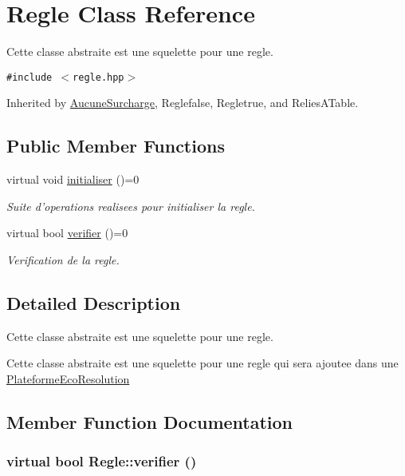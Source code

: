 \hypertarget{classRegle}{
\section{Regle Class Reference}
\label{classRegle}
}
Cette classe abstraite est une squelette pour une regle.  


{\tt \#include $<$regle.hpp$>$}

Inherited by \hyperlink{classAucuneSurcharge}{AucuneSurcharge}, Reglefalse, Regletrue, and ReliesATable.

\subsection*{Public Member Functions}
\begin{CompactItemize}
\item 
\hypertarget{classRegle_b9a0850b2a83f2f0a8deaac82c4500c0}{
virtual void \hyperlink{classRegle_b9a0850b2a83f2f0a8deaac82c4500c0}{initialiser} ()=0}
\label{classRegle_b9a0850b2a83f2f0a8deaac82c4500c0}

\begin{CompactList}\small\item\em Suite d'operations realisees pour initialiser la regle. \item\end{CompactList}\item 
virtual bool \hyperlink{classRegle_4b3de9a64ec0e948e9177026afcc073d}{verifier} ()=0
\begin{CompactList}\small\item\em Verification de la regle. \item\end{CompactList}\end{CompactItemize}


\subsection{Detailed Description}
Cette classe abstraite est une squelette pour une regle. 

Cette classe abstraite est une squelette pour une regle qui sera ajoutee dans une \hyperlink{classPlateformeEcoResolution}{PlateformeEcoResolution} 

\subsection{Member Function Documentation}
\hypertarget{classRegle_4b3de9a64ec0e948e9177026afcc073d}{
\subsubsection[{verifier}]{\setlength{\rightskip}{0pt plus 5cm}virtual bool Regle::verifier ()}}
\label{classRegle_4b3de9a64ec0e948e9177026afcc073d}


